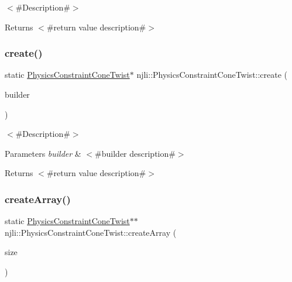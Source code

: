 $<$\#\+Description\#$>$

\begin{DoxyReturn}{Returns}
$<$\#return value description\#$>$ 
\end{DoxyReturn}
\mbox{\label{classnjli_1_1_physics_constraint_cone_twist_ad5435f5177a5d4980ba8f1073e91eafa}} 
\subsubsection{\texorpdfstring{create()}{create()}\hspace{0.1cm}{\footnotesize\ttfamily [2/2]}}
{\footnotesize\ttfamily static \mbox{\hyperlink{classnjli_1_1_physics_constraint_cone_twist}{Physics\+Constraint\+Cone\+Twist}}$\ast$ njli\+::\+Physics\+Constraint\+Cone\+Twist\+::create (\begin{DoxyParamCaption}\item[{const \mbox{\hyperlink{classnjli_1_1_physics_constraint_cone_twist_builder}{Physics\+Constraint\+Cone\+Twist\+Builder}} \&}]{builder }\end{DoxyParamCaption})\hspace{0.3cm}{\ttfamily [static]}}

$<$\#\+Description\#$>$


\begin{DoxyParams}{Parameters}
{\em builder} & $<$\#builder description\#$>$\\
\hline
\end{DoxyParams}
\begin{DoxyReturn}{Returns}
$<$\#return value description\#$>$ 
\end{DoxyReturn}
\mbox{\label{classnjli_1_1_physics_constraint_cone_twist_a9320581689ebce20210ed1d0239d1257}} 
\subsubsection{\texorpdfstring{create\+Array()}{createArray()}}
{\footnotesize\ttfamily static \mbox{\hyperlink{classnjli_1_1_physics_constraint_cone_twist}{Physics\+Constraint\+Cone\+Twist}}$\ast$$\ast$ njli\+::\+Physics\+Constraint\+Cone\+Twist\+::create\+Array (\begin{DoxyParamCaption}\item[{const \mbox{\hyperlink{_util_8h_a10e94b422ef0c20dcdec20d31a1f5049}{u32}}}]{size }\end{DoxyParamCaption})\hspace{0.3cm}{\ttfamily [static]}}

